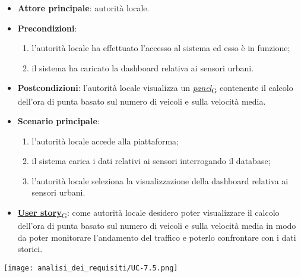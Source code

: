 \begin{itemize}
	\item \textbf{Attore principale}: autorità locale.
	\item \textbf{Precondizioni}:
	      \begin{enumerate}
		      \item l'autorità locale ha effettuato l'accesso al sistema ed esso è in funzione;
		      \item il sistema ha caricato la dashboard relativa ai sensori urbani.
	      \end{enumerate}
	\item \textbf{Postcondizioni}: l'autorità locale visualizza un \href{https://7last.github.io/docs/rtb/documentazione-interna/glossario\#panel}{\textit{panel}\textsubscript{G}} contenente il calcolo dell'ora di punta basato sul numero di veicoli e sulla velocità media.
	\item \textbf{Scenario principale}:
	      \begin{enumerate}
		      \item l'autorità locale accede alla piattaforma;
		      \item il sistema carica i dati relativi ai sensori interrogando il database;
		      \item l'autorità locale seleziona la visualizzazione della dashboard relativa ai sensori urbani.
	      \end{enumerate}
	\item \href{https://7last.github.io/docs/rtb/documentazione-interna/glossario\#user-story}{\textbf{User story}\textsubscript{G}}:
	      come autorità locale desidero poter visualizzare il calcolo dell'ora di punta basato sul numero di veicoli e sulla velocità media in modo da poter monitorare
	      l'andamento del traffico e poterlo confrontare con i dati storici.
\end{itemize}
\begin{center}
	\texttt{[image: analisi\_dei\_requisiti/UC-7.5.png]}
\end{center}

